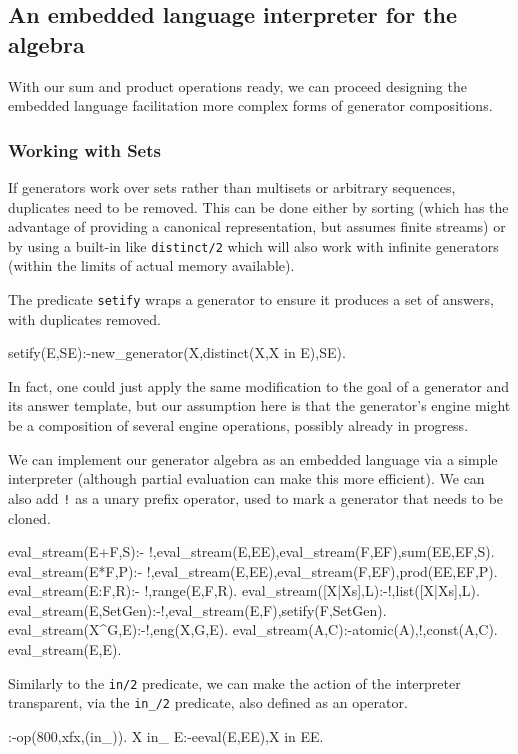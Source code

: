 \documentclass{new_tlp}
\begin{document}
\subsection{An embedded language interpreter for the algebra}

With our sum and product operations ready, we can proceed designing the embedded language
facilitation more complex forms of generator compositions.

\subsubsection{Working with Sets}

If generators work over sets rather than multisets or arbitrary sequences,
duplicates need to be removed. This can be done either by sorting (which has the advantage
of providing a canonical representation, but assumes finite streams) or by using  a built-in like {\tt distinct/2} which will also work with infinite generators (within the limits of actual memory available).

The predicate {\tt setify} wraps a generator to ensure it produces a set of answers, with duplicates removed.
\begin{code}
setify(E,SE):-new_generator(X,distinct(X,X in E),SE).
\end{code}
In fact, one could just apply the same modification to the goal of a generator and its answer template, but our assumption here is that the generator's engine might be a composition of several engine operations, possibly already in progress.

We can implement our generator algebra as an embedded language via a simple interpreter
(although partial evaluation can make this more efficient). We can also add {\tt !} as a unary prefix operator, used to mark a generator that needs to be cloned.

\begin{code}
eval_stream(E+F,S):- !,eval_stream(E,EE),eval_stream(F,EF),sum(EE,EF,S).
eval_stream(E*F,P):- !,eval_stream(E,EE),eval_stream(F,EF),prod(EE,EF,P).
eval_stream(E:F,R):- !,range(E,F,R).
eval_stream([X|Xs],L):-!,list([X|Xs],L).
eval_stream({E},SetGen):-!,eval_stream(E,F),setify(F,SetGen).
eval_stream(X^G,E):-!,eng(X,G,E).
eval_stream(A,C):-atomic(A),!,const(A,C).
eval_stream(E,E).
\end{code}
Similarly to the {\tt in/2} predicate, we can make the action of the
interpreter transparent, via the {\tt in\_/2} predicate, also defined as an operator.
\begin{code}
:-op(800,xfx,(in_)).
X in_ E:-eeval(E,EE),X in EE.     
\end{code}
\end{document}
